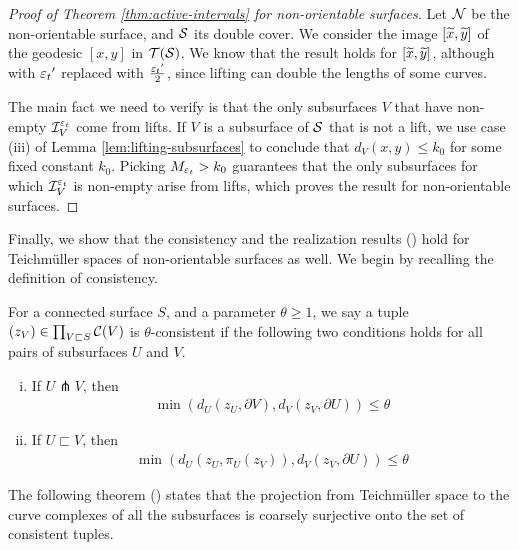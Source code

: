 \documentclass[12pt, reqno]{amsart}
\begin{document}
\begin{proof}[Proof of Theorem \ref{thm:active-intervals} for non-orientable surfaces]
  Let $\mathcal{N}$ be the non-orientable surface, and $\mathcal{S}$ its double cover.
  We consider the image $[\widetilde{x}, \widetilde{y}]$ of the geodesic $[x,y]$ in $\mathcal{T}(\mathcal{S})$.
  We know that the result holds for $[\widetilde{x}, \widetilde{y}]$, although with ${\varepsilon_t}^{\prime}$ replaced with $\frac{{\varepsilon_t}^{\prime}}{2}$, since lifting can double the lengths of some curves.

  The main fact we need to verify is that the only subsurfaces $V$ that have non-empty $\mathcal{I}_V^{\varepsilon_t}$ come from lifts.
  If $V$ is a subsurface of $\mathcal{S}$ that is not a lift, we use case (iii) of Lemma \ref{lem:lifting-subsurfaces} to conclude that $d_V(x, y) \leq k_0$ for some fixed constant $k_0$.
  Picking $M_{\varepsilon_t} > k_0$ guarantees that the only subsurfaces for which $\mathcal{I}_V^{\varepsilon_t}$ is non-empty arise from lifts, which proves the result for non-orientable surfaces.
\end{proof}

Finally, we show that the consistency and the realization results (\textcite{behrstock2012geometry}) hold for Teichmüller spaces of non-orientable surfaces as well.
We begin by recalling the definition of consistency.

\begin{definition}[Consistency]
  For a connected surface $S$, and a parameter $\theta \geq 1$, we say a tuple $(z_V) \in \prod_{V \sqsubset S} \mathcal{C}(V)$ is $\theta$-consistent if the following two conditions holds for all pairs of subsurfaces $U$ and $V$.
  \begin{enumerate}[(i)]
  \item If $U \pitchfork V$, then
    \begin{align*}
      \min(d_U(z_U, \partial V), d_V(z_V, \partial U)) \leq \theta
    \end{align*}
  \item If $U \sqsubset V$, then
    \begin{align*}
      \min(d_U(z_U, \pi_U(z_V)), d_V(z_V, \partial U)) \leq \theta
    \end{align*}
  \end{enumerate}
\end{definition}

The following theorem (\textcite[Theorem 4.3]{behrstock2012geometry}) states that the projection from Teichmüller space to the curve complexes of all the subsurfaces is coarsely surjective onto the set of consistent tuples.
\end{document}
